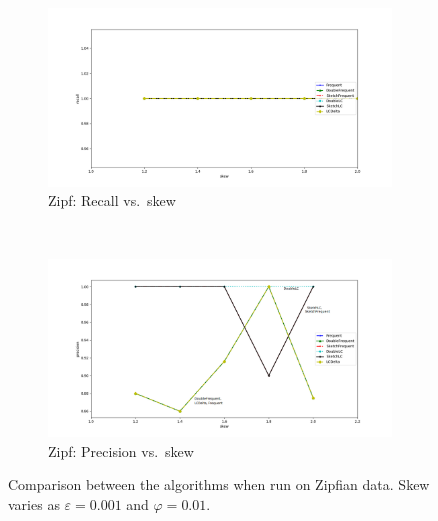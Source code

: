\documentclass[sigconf,review=true,anonymous=true,screen]{acmart}
\newcommand{\eps}{\varepsilon}
\renewcommand{\phi}{\varphi}
\begin{document}
\begin{figure}[!h]
\begin{subfigure}[b]{0.3\textwidth}
\includegraphics[width=\textwidth]{../Plots/recall_skew.png}
\caption{Zipf: Recall vs.~skew}
\label{fig:ziprecskew}
\end{subfigure}
~
\begin{subfigure}[b]{0.3\textwidth}
\includegraphics[width=\textwidth]{../Plots/precision_skew.png}
\caption{Zipf: Precision vs.~skew}
\label{fig:zippreskew}
\end{subfigure}
\caption{Comparison between the algorithms when run on Zipfian data. Skew varies as $\eps = 0.001$ and $\phi = 0.01$.}
\label{fig:varyskew}
\end{figure}
\end{document}
